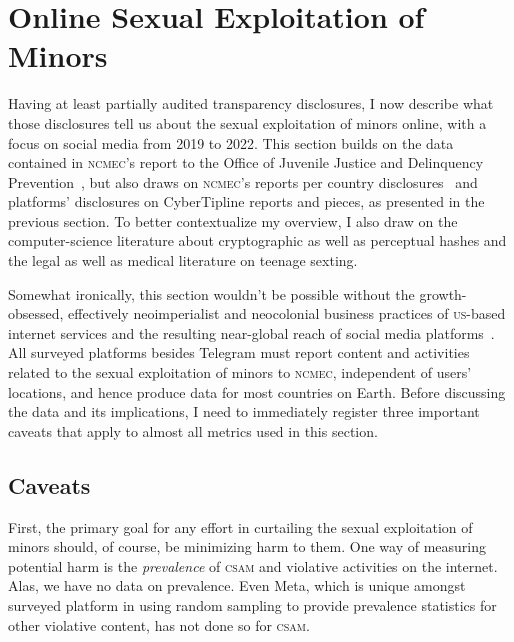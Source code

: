 \documentclass[nonacm,screen]{acmart}
\newcommand\V[1]{\textsc{\MakeLowercase{#1}}}
\begin{document}

\section{Online Sexual Exploitation of Minors}
\label{sec:global-spread}

Having at least partially audited transparency disclosures, I now describe what
those disclosures tell us about the sexual exploitation of minors online, with a
focus on social media from 2019 to 2022. This section builds on the data
contained in \V{NCMEC}'s report to the Office of Juvenile Justice and
Delinquency Prevention~\cite{NCMEC2023}, but also draws on \V{NCMEC}'s reports
per country disclosures~\cite{NcmecByCountry2019,NcmecByCountry2020,
NcmecByCountry2021,NcmecByCountry2022} and platforms' disclosures on
CyberTipline reports and pieces, as presented in the previous section. To better
contextualize my overview, I also draw on the computer-science literature about
cryptographic as well as perceptual hashes and the legal as well as medical
literature on teenage sexting.

Somewhat ironically, this section wouldn't be possible without the
growth-obsessed, effectively neoimperialist and neocolonial business practices
of \V{US}-based internet services and the resulting near-global reach of social
media platforms~\cite{CouldryMejias2019,ThatcherOSullivanea2016}. All surveyed
platforms besides Telegram must report content and activities related to the
sexual exploitation of minors to \V{NCMEC}, independent of users' locations, and
hence produce data for most countries on Earth. Before discussing the data and
its implications, I need to immediately register three important caveats that
apply to almost all metrics used in this section.


\subsection{Caveats}

First, the primary goal for any effort in curtailing the sexual exploitation of
minors should, of course, be minimizing harm to them. One way of measuring
potential harm is the \emph{prevalence} of \V{CSAM} and violative activities on
the internet. Alas, we have no data on prevalence. Even Meta, which is unique
amongst surveyed platform in using random sampling to provide prevalence
statistics for other violative content, has not done so for \V{CSAM}.
\end{document}
